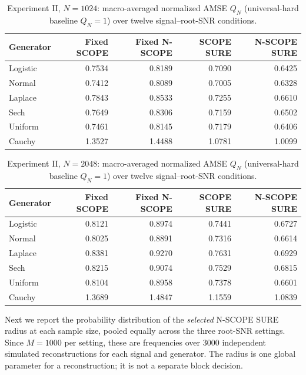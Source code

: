 \documentclass[11pt]{article}
\numberwithin{equation}{section}
\begin{document}
\begin{table}[H]
\centering\small
\caption{Experiment II, $N=1024$: macro-averaged normalized AMSE $Q_N$ (universal-hard baseline $Q_N=1$) over twelve signal--root-SNR conditions.}
\label{tab:s5-e2-q-1024}
\setlength{\tabcolsep}{5pt}
\begin{tabular}{lrrrr}
\toprule
Generator & Fixed SCOPE & Fixed N-SCOPE & SCOPE SURE & N-SCOPE SURE \\
\midrule
Logistic & 0.7534 & 0.8189 & 0.7090 & 0.6425 \\
Normal & 0.7412 & 0.8089 & 0.7005 & 0.6328 \\
Laplace & 0.7843 & 0.8533 & 0.7255 & 0.6610 \\
Sech & 0.7649 & 0.8306 & 0.7159 & 0.6502 \\
Uniform & 0.7461 & 0.8145 & 0.7179 & 0.6406 \\
Cauchy & 1.3527 & 1.4488 & 1.0781 & 1.0099 \\
\bottomrule
\end{tabular}
\end{table}

\begin{table}[H]
\centering\small
\caption{Experiment II, $N=2048$: macro-averaged normalized AMSE $Q_N$ (universal-hard baseline $Q_N=1$) over twelve signal--root-SNR conditions.}
\label{tab:s5-e2-q-2048}
\setlength{\tabcolsep}{5pt}
\begin{tabular}{lrrrr}
\toprule
Generator & Fixed SCOPE & Fixed N-SCOPE & SCOPE SURE & N-SCOPE SURE \\
\midrule
Logistic & 0.8121 & 0.8974 & 0.7441 & 0.6727 \\
Normal & 0.8025 & 0.8891 & 0.7316 & 0.6614 \\
Laplace & 0.8381 & 0.9270 & 0.7631 & 0.6929 \\
Sech & 0.8215 & 0.9074 & 0.7529 & 0.6815 \\
Uniform & 0.8104 & 0.8958 & 0.7378 & 0.6601 \\
Cauchy & 1.3689 & 1.4847 & 1.1559 & 1.0839 \\
\bottomrule
\end{tabular}
\end{table}


Next we report the probability distribution of the \emph{selected}
N-SCOPE SURE radius at each sample size, pooled equally across the
three root-SNR settings. Since $M=1000$ per setting, these are
frequencies over 3000 independent simulated reconstructions for each
signal and generator. The radius is one global parameter for a
reconstruction; it is not a separate block decision.
\end{document}
